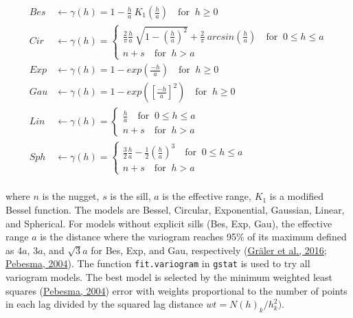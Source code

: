 \begin{equation}
  \begin{aligned}
    Bes &\leftarrow \gamma(h) = 1 - \frac{h}{a}\ K_1\left(\frac{h}{a}\right) \quad \text{for } \  h \geq 0 \\
    Cir &\leftarrow \gamma(h) =
    \begin{cases}
      \frac{2}{\pi}\frac{h}{a}\ \sqrt{1-\left(\frac{h}{a}\right)^2} + \frac{2}{\pi}\ arcsin\left(\frac{h}{a}\right) \quad \text{for } \  0 \leq h \leq a \\
      n + s \quad \text{for } \  h > a
    \end{cases} \\
    Exp &\leftarrow \gamma(h) = 1 - exp\left(\frac{-h}{a}\right) \quad \text{for } \  h \geq 0 \\
    Gau &\leftarrow \gamma(h) = 1 - exp\left(\left[\frac{-h}{a}\right]^2\right) \quad \text{for } \  h \geq 0 \\
    Lin &\leftarrow \gamma(h) =
    \begin{cases}
      \frac{h}{a} \quad \text{for } \  0 \leq h \leq a \\
      n + s \quad \text{for } \  h > a
    \end{cases} \\
    Sph &\leftarrow \gamma(h) =
    \begin{cases}
      \frac{3}{2}\frac{h}{a} - \frac{1}{2}\left(\frac{h}{a}\right)^3 \quad \text{for } \  0 \leq h \leq a \\
      n + s \quad \text{for } \  h > a
    \end{cases} \\
  \end{aligned}
  \label{eq:varMods}
\end{equation}

where \(n\) is the nugget, \(s\) is the sill, \(a\) is the effective range, \(K_1\) is a modified Bessel function. The models are Bessel, Circular, Exponential, Gaussian, Linear, and Spherical. For models without explicit sills (Bes, Exp, Gau), the effective range \(a\) is the distance where the variogram reaches 95\% of its maximum defined as 4\(a\), 3\(a\), and \(\sqrt{3}a\) for Bes, Exp, and Gau, respectively (\protect\hyperlink{ref-graler2016}{Gräler et al., 2016}; \protect\hyperlink{ref-pebesma2004}{Pebesma, 2004}). The function \texttt{fit.variogram} in \texttt{gstat} is used to try all variogram models. The best model is selected by the minimum weighted least squares (\protect\hyperlink{ref-pebesma2004}{Pebesma, 2004}) error with weights proportional to the number of points in each lag divided by the squared lag distance \(wt = N(h)_k/h_k^2)\).

